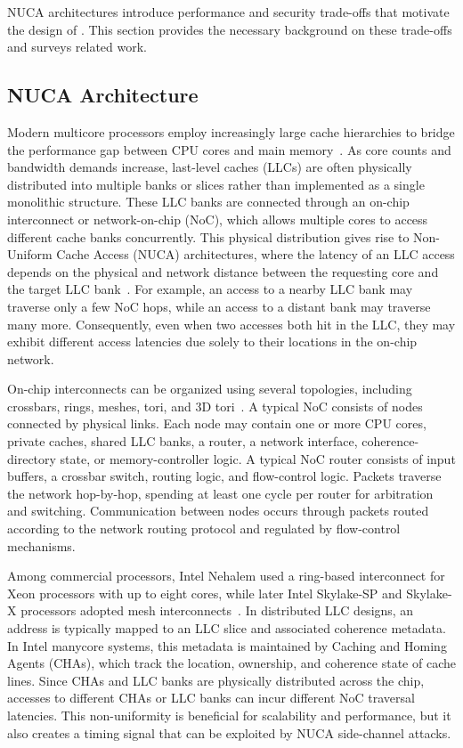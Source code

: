 NUCA architectures introduce performance and security trade-offs that motivate the design of \scheme{}.
This section provides the necessary background on these trade-offs and surveys related work.

\subsection{NUCA Architecture}
Modern multicore processors employ increasingly large cache hierarchies to bridge the performance gap between CPU cores and main memory~\cite{muralimanohar2007interconnect, jaleel2006last}.
As core counts and bandwidth demands increase, last-level caches (LLCs) are often physically distributed into multiple banks or slices rather than implemented as a single monolithic structure.
These LLC banks are connected through an on-chip interconnect or network-on-chip (NoC), which allows multiple cores to access different cache banks concurrently.
This physical distribution gives rise to Non-Uniform Cache Access (NUCA) architectures, where the latency of an LLC access depends on the physical and network distance between the requesting core and the target LLC bank~\cite{kim2002adaptive}.
For example, an access to a nearby LLC bank may traverse only a few NoC hops, while an access to a distant bank may traverse many more.
Consequently, even when two accesses both hit in the LLC, they may exhibit different access latencies due solely to their locations in the on-chip network.

On-chip interconnects can be organized using several topologies, including crossbars, rings, meshes, tori, and 3D tori~\cite{jerger2009chip}.
A typical NoC consists of nodes connected by physical links.
Each node may contain one or more CPU cores, private caches, shared LLC banks, a router, a network interface, coherence-directory state, or memory-controller logic.
A typical NoC router consists of input buffers, a crossbar switch, routing logic, and flow-control logic.
Packets traverse the network hop-by-hop, spending at least one cycle per router for arbitration and switching.
Communication between nodes occurs through packets routed according to the network routing protocol and regulated by flow-control mechanisms.

Among commercial processors, Intel Nehalem used a ring-based interconnect for Xeon processors with up to eight cores, while later Intel Skylake-SP and Skylake-X processors adopted mesh interconnects~\cite{kommrusch2021optimizing,dont-mess-around}.
In distributed LLC designs, an address is typically mapped to an LLC slice and associated coherence metadata.
In Intel manycore systems, this metadata is maintained by Caching and Homing Agents (CHAs), which track the location, ownership, and coherence state of cache lines.
Since CHAs and LLC banks are physically distributed across the chip, accesses to different CHAs or LLC banks can incur different NoC traversal latencies.
This non-uniformity is beneficial for scalability and performance, but it also creates a timing signal that can be exploited by NUCA side-channel attacks.

